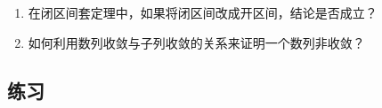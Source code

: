 \documentclass[a4paper,punct=CCT]{ctexbook}
\theoremstyle{definition}
\theoremstyle{remark}
\newif\ifshowex
\newif\ifshowsolp
\begin{document}
\begin{enumerate}
\item 在闭区间套定理中，如果将闭区间改成开区间，结论是否成立？

  \ifshowsolp
  不成立，最终可能是一个空集．设\(a_n = 0,\ b_n = 1/n\)，显然有\(\paren{a_{n+1}, b_{n+1}} \subset \paren{a_n, b_n}\)且\(\lim_{n\to\infty} \paren{b_n - a_n} = 0\)．但是,
  \begin{equation*}
    \bigcap_{n=1}^\infty \paren{a_n, b_n} = \bigcap_{n=1}^\infty \paren[\Big]{0, \frac1n} = \emptyset.
  \end{equation*}
  \fi

\item 如何利用数列收敛与子列收敛的关系来证明一个数列非收敛？

  \ifshowsolp
  只要找到该数列的一个不收敛子列即可．
  \fi
\end{enumerate}

\ifshowex
{}
\subsection*{练习}
\end{document}
